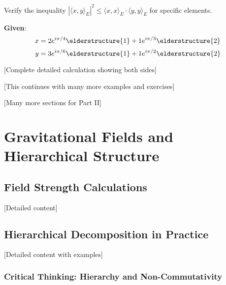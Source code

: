 \begin{example}
Verify the inequality $|\langle x, y \rangle_E|^2 \leq \langle x, x \rangle_E \cdot \langle y, y \rangle_E$ for specific elements.

\textbf{Given}:
$$x = 2e^{i\pi/4}\elderstructure{1} + 1e^{i\pi/3}\elderstructure{2}$$
$$y = 3e^{i\pi/6}\elderstructure{1} + 1e^{i\pi/2}\elderstructure{2}$$

[Complete detailed calculation showing both sides]

[This continues with many more examples and exercises]

\end{example}

[Many more sections for Part II]

\chapter{Gravitational Fields and Hierarchical Structure}

\section{Field Strength Calculations}

[Detailed content]

\section{Hierarchical Decomposition in Practice}

[Detailed content with examples]

\subsection{Critical Thinking: Hierarchy and Non-Commutativity}

